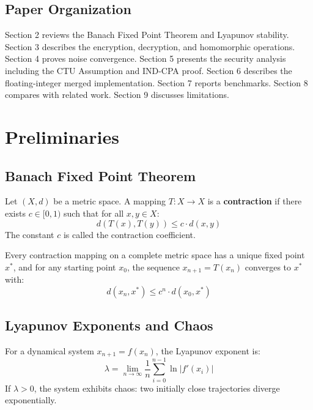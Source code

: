 \documentclass[11pt,a4paper]{article}
\begin{document}
\subsection{Paper Organization}
Section 2 reviews the Banach Fixed Point Theorem and Lyapunov stability. Section 3 describes the encryption, decryption, and homomorphic operations. Section 4 proves noise convergence. Section 5 presents the security analysis including the CTU Assumption and IND-CPA proof. Section 6 describes the floating-integer merged implementation. Section 7 reports benchmarks. Section 8 compares with related work. Section 9 discusses limitations.

\section{Preliminaries}

\subsection{Banach Fixed Point Theorem}

\begin{definition}
Let $(X, d)$ be a metric space. A mapping $T : X \to X$ is a \textbf{contraction} if there exists $c \in [0, 1)$ such that for all $x, y \in X$:
\[
d(T(x), T(y)) \leq c \cdot d(x, y)
\]
The constant $c$ is called the contraction coefficient.
\end{definition}

\begin{theorem}
Every contraction mapping on a complete metric space has a unique fixed point $x^*$, and for any starting point $x_0$, the sequence $x_{n+1} = T(x_n)$ converges to $x^*$ with:
\[
d(x_n, x^*) \leq c^n \cdot d(x_0, x^*)
\]
\end{theorem}

\subsection{Lyapunov Exponents and Chaos}

\begin{definition}
For a dynamical system $x_{n+1} = f(x_n)$, the Lyapunov exponent is:
\[
\lambda = \lim_{n \to \infty} \frac{1}{n} \sum_{i=0}^{n-1} \ln |f'(x_i)|
\]
If $\lambda > 0$, the system exhibits chaos: two initially close trajectories diverge exponentially.
\end{definition}
\end{document}
